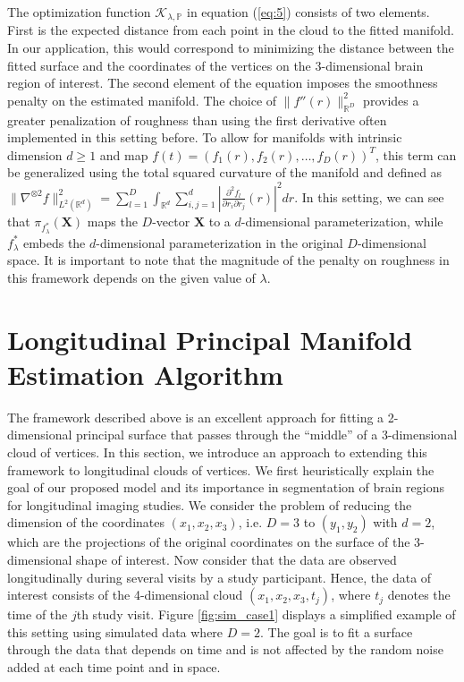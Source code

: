 \documentclass[11pt,reqno]{article}
\theoremstyle{definition}
\begin{document}
The optimization function $\mathcal{K}_{\lambda, \mathbb{P}}$ in equation (\ref{eq:5}) consists of two elements. First is the expected distance from each point in the cloud to the fitted manifold. In our application, this would correspond to minimizing the distance between the fitted surface and the coordinates of the vertices on the 3-dimensional brain region of interest. The second element of the equation imposes the smoothness penalty on the estimated manifold. The choice of $\|f''(r)\|_{\mathbb{R}^{D}}^2$ provides a greater penalization of roughness than using the first derivative often implemented in this setting before. To allow for manifolds with intrinsic dimension $d \geq 1$ and map $f(t) = \left(f_1(r), f_2(r), \dots, f_D(r)\right)^{T}$, this term can be generalized using the total squared curvature of the manifold and defined as $\|\nabla^{\otimes 2}f\|_{L^2(\mathbb{R}^{d})}^2 = \sum_{l=1}^{D} \int_{\mathbb{R}^{d}}\sum_{i, j = 1}^{d}\left|\frac{\partial^2f_l}{\partial r_i \partial r_j}(r)\right|^2dr$. In this setting, we can see that $\pi_{f_{\lambda}^{*}}(\boldsymbol{X})$ maps the $D$-vector $\boldsymbol{X}$ to a $d$-dimensional parameterization, while $f_{\lambda}^{*}$ embeds the $d$-dimensional parameterization in the original $D$-dimensional space. It is important to note that the  magnitude of the penalty on roughness in this framework depends on the given value of $\lambda$.








\section{Longitudinal Principal Manifold Estimation Algorithm}\label{s:LPME}

The framework described above is an excellent approach for fitting a 2-dimensional principal surface that passes through the ``middle'' of a 3-dimensional cloud of vertices. In this section, we introduce an approach to extending this framework to longitudinal clouds of vertices. We first heuristically explain the goal of our proposed model and its importance in segmentation of brain regions for longitudinal imaging studies. We consider the problem of reducing the dimension of the coordinates $(x_1, x_2, x_3)$, i.e. $D=3$ to $(y_1,y_2)$ with $d=2$, which are the projections of the original coordinates on the surface of the 3-dimensional shape of interest. Now consider that the data are observed longitudinally during several visits by a study participant. Hence, the data of interest consists of the 4-dimensional cloud $(x_1, x_2, x_3,t_j)$, where $t_j$ denotes the time of the $j$th study visit. Figure \ref{fig:sim_case1} displays a simplified example of this setting using simulated data where $D = 2$. The goal is to fit a surface through the data that depends on time and is not affected by the random noise added at each time point and in space.
\end{document}
